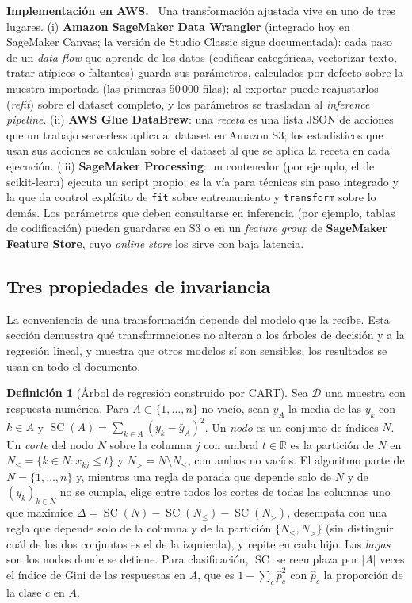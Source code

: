 \documentclass[11pt,a4paper]{article}
\theoremstyle{plain}
\theoremstyle{definition}
\newtheorem{definicion}[teorema]{Definición}
\theoremstyle{remark}
\newcommand{\R}{\mathbb{R}}
\newcommand{\SC}{\operatorname{SC}}
\newcommand{\1}{\mathbf{1}}
\newenvironment{aws}{\par\medskip\sloppy\noindent\textbf{Implementación en AWS.}\ }{\par\medskip}
\begin{document}
\begin{aws}
Una transformación ajustada vive en uno de tres lugares.
(i) \textbf{Amazon SageMaker Data Wrangler} (integrado hoy en SageMaker
Canvas; la versión de Studio Classic sigue documentada): cada paso de un
\emph{data flow} que aprende de los datos (codificar categóricas,
vectorizar texto, tratar atípicos o faltantes) guarda sus parámetros,
calculados por defecto sobre la muestra importada (las primeras 50\,000
filas); al exportar puede reajustarlos (\emph{refit}) sobre el dataset
completo, y los parámetros se trasladan al \emph{inference pipeline}.
(ii) \textbf{AWS Glue DataBrew}: una \emph{receta} es una lista JSON de
acciones que un trabajo serverless aplica al dataset en Amazon S3; los
estadísticos que usan sus acciones se calculan sobre el dataset al que se
aplica la receta en cada ejecución. (iii) \textbf{SageMaker Processing}: un
contenedor (por ejemplo, el de scikit-learn) ejecuta un script propio; es
la vía para técnicas sin paso integrado y la que da control explícito de
\texttt{fit} sobre entrenamiento y \texttt{transform} sobre lo demás. Los
parámetros que deben consultarse en inferencia (por ejemplo, tablas de
codificación) pueden guardarse en S3 o en un \emph{feature group} de
\textbf{SageMaker Feature Store}, cuyo \emph{online store} los sirve con
baja latencia.
\end{aws}

\subsection{Tres propiedades de invariancia}\label{sec:invariancias}

La conveniencia de una transformación depende del modelo que la recibe.
Esta sección demuestra qué transformaciones no alteran a los árboles de
decisión y a la regresión lineal, y muestra que otros modelos sí son
sensibles; los resultados se usan en todo el documento.

\begin{definicion}[Árbol de regresión construido por CART]\label{def:cart}
Sea $\mathcal D$ una muestra con respuesta numérica. Para
$A\subset\{1,\dots,n\}$ no vacío, sean $\bar y_A$ la media de las $y_k$ con
$k\in A$ y $\SC(A)=\sum_{k\in A}(y_k-\bar y_A)^2$. Un \emph{nodo} es un
conjunto de índices $N$. Un \emph{corte} del nodo $N$ sobre la columna $j$
con umbral $t\in\R$ es la partición de $N$ en
$N_{\le}=\{k\in N:x_{kj}\le t\}$ y $N_{>}=N\setminus N_{\le}$, con ambos
no vacíos. El algoritmo parte de $N=\{1,\dots,n\}$ y, mientras una regla
de parada que depende solo de $N$ y de $(y_k)_{k\in N}$ no se cumpla,
elige entre todos los cortes de todas las columnas uno que maximice
$\Delta=\SC(N)-\SC(N_\le)-\SC(N_>)$, desempata con una regla que depende
solo de la columna y de la partición $\{N_\le,N_>\}$ (sin distinguir
cuál de los dos conjuntos es el de la izquierda), y repite en cada hijo. Las
\emph{hojas} son los nodos donde se detiene. Para clasificación, $\SC$ se
reemplaza por $|A|$ veces el índice de Gini de las respuestas en $A$, que es $1-\sum_c\hat p_c^2$ con $\hat p_c$ la proporción de la clase $c$ en $A$.
\end{definicion}
\end{document}
